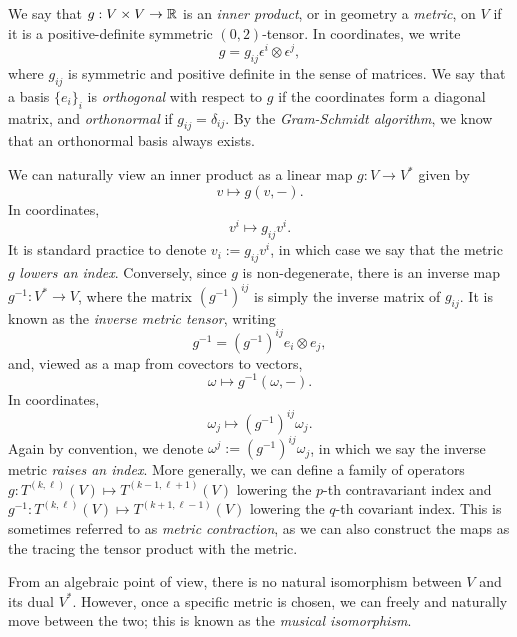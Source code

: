 We say that $g: V \times V \to \mathbb R$ is an \emph{inner product}, or in geometry a \emph{metric}, on $V$ if it is a positive-definite symmetric $(0, 2)$-tensor. In coordinates, we write
	\[ g = g_{ij} \epsilon^i \otimes \epsilon^j, \]
where $g_{ij}$ is symmetric and positive definite in the sense of matrices. We say that a basis $\{e_i\}_i$ is \emph{orthogonal} with respect to $g$ if the coordinates form a diagonal matrix, and \emph{orthonormal} if $g_{ij} = \delta_{ij}$. By the \textit{Gram-Schmidt algorithm}, we know that an orthonormal basis always exists. 

We can naturally view an inner product as a linear map $g : V \to V^*$ given by 
	\[ v \mapsto g(v, -). \]
In coordinates,
	\[ v^i \mapsto g_{ij} v^i. \]	
It is standard practice to denote $v_i := g_{ij} v^i$, in which case we say that the metric $g$ \textit{lowers an index}. Conversely, since $g$ is non-degenerate, there is an inverse map $g^{-1} : V^* \to V$, where the matrix $(g^{-1})^{ij}$ is simply the inverse matrix of $g_{ij}$. It is known as the \emph{inverse metric tensor}, writing
	\[ g^{-1} = (g^{-1})^{ij} e_i \otimes e_j,  \]
and, viewed as a map from covectors to vectors, 
	\[ \omega \mapsto g^{-1} (\omega, -). \]	
In coordinates, 
	\[ \omega_j \mapsto (g^{-1})^{ij} \omega_j. \]
Again by convention, we denote $\omega^j :=  (g^{-1})^{ij} \omega_j$, in which we say the inverse metric \textit{raises an index}. More generally, we can define a family of operators $g: T^{(k, \ell)} (V) \mapsto T^{(k - 1, \ell + 1)} (V)$ lowering the $p$-th contravariant index and $g^{-1} : T^{(k, \ell)} (V) \mapsto T^{(k + 1, \ell - 1)} (V)$ lowering the $q$-th covariant index. This is sometimes referred to as \textit{metric contraction}, as we can also construct the maps as the tracing the tensor product with the metric. 

\begin{remark}
	From an algebraic point of view, there is no natural isomorphism between $V$ and its dual $V^*$. However, once a specific metric is chosen, we can freely and naturally move between the two; this is known as the \textit{musical isomorphism}. 
\end{remark}